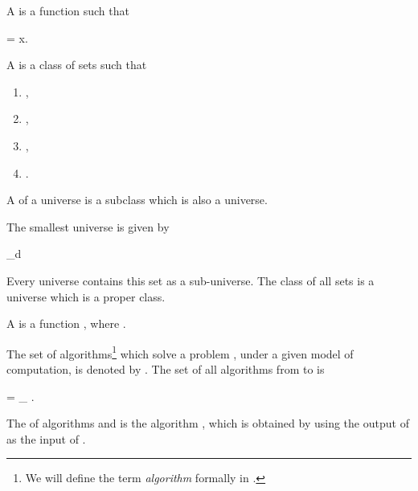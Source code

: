 \documentclass[b5paper, english, oneside]{memoir}
\begin{document}
\begin{definition}[Projection]
A  is a function  such that
\begin{eqs}
 = x.
\end{eqs}
\end{definition}

\begin{definition}[Universe]
A  is a class  of sets such that
\begin{enumerate}
\item ,
\item ,
\item ,
\item .
\end{enumerate}
\end{definition}

\begin{definition}
A  of a universe  is a subclass  which is also a universe. 
\end{definition}

\begin{example}
The smallest universe is given by
\begin{eqs}
\bigcup_{d \in \TN}  
\end{eqs}
Every universe contains this set as a sub-universe. The class of all sets is a universe which is a proper class.
\end{example}

\begin{definition}
A  is a function , where . 
\end{definition}

\begin{definition}
The set of algorithms\footnote{We will define the term \emph{algorithm} formally in .} which solve a problem , under a given model of computation, is denoted by . The set of all algorithms from  to  is
\begin{eqs}
 = \bigcup_{} .
\end{eqs}
\end{definition}

\begin{definition}
The  of algorithms  and  is the algorithm , which is obtained by using the output of  as the input of .
\end{definition}
\end{document}
